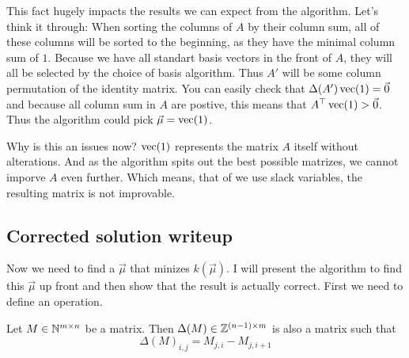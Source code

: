 This fact hugely impacts the results we can expect from the algorithm. Let's think it through: When sorting the columns of $A$ by their column sum, all of these columns will be sorted to the beginning, as they have the minimal column sum of $1$. Because we have all standart basis vectors in the front of $A$, they will all be selected by the choice of basis algorithm. Thus $A'$ will be some column permutation of the identity matrix. You can easily check that $\Delta(A')\operatorname{vec}(1) = \vec 0$ and because all column sum in $A$ are postive, this means that $A^\top \operatorname{vec}(1) > \vec 0$. Thus the algorithm could pick $\vec\mu = \operatorname{vec}(1)$.

Why is this an issues now? $\operatorname{vec}(1)$ represents the matrix $A$ itself without alterations. And as the algorithm spits out the best possible matrizes, we cannot imporve $A$ even further. Which means, that of we use slack variables, the resulting matrix is not improvable.

\subsection{Corrected solution writeup}
Now we need to find a $\vec\mu$ that minizes $k(\vec\mu)$. I will present the algorithm to find this $\vec\mu$ up front and then show that the result is actually correct. First we need to define an operation. 
\begin{definition}
    Let $M \in \mathbb{N}^{m\times n}$ be a matrix. Then $\Delta(M) \in \mathbb{Z}^{(n-1)\times m}$ is also a matrix such that 
    $$\Delta(M)_{i,j} = M_{j,i} - M_{j,i+1}$$
\end{definition}

